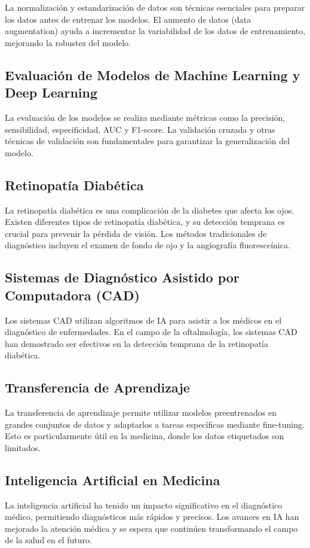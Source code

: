 La normalización y estandarización de datos son técnicas esenciales para preparar los datos antes de entrenar los modelos. El aumento de datos (data augmentation) ayuda a incrementar la variabilidad de los datos de entrenamiento, mejorando la robustez del modelo.

\subsection{Evaluación de Modelos de Machine Learning y Deep Learning}

La evaluación de los modelos se realiza mediante métricas como la precisión, sensibilidad, especificidad, AUC y F1-score. La validación cruzada y otras técnicas de validación son fundamentales para garantizar la generalización del modelo.

\subsection{Retinopatía Diabética}

La retinopatía diabética es una complicación de la diabetes que afecta los ojos. Existen diferentes tipos de retinopatía diabética, y su detección temprana es crucial para prevenir la pérdida de visión. Los métodos tradicionales de diagnóstico incluyen el examen de fondo de ojo y la angiografía fluoresceínica.

\subsection{Sistemas de Diagnóstico Asistido por Computadora (CAD)}

Los sistemas CAD utilizan algoritmos de IA para asistir a los médicos en el diagnóstico de enfermedades. En el campo de la oftalmología, los sistemas CAD han demostrado ser efectivos en la detección temprana de la retinopatía diabética.

\subsection{Transferencia de Aprendizaje}

La transferencia de aprendizaje permite utilizar modelos preentrenados en grandes conjuntos de datos y adaptarlos a tareas específicas mediante fine-tuning. Esto es particularmente útil en la medicina, donde los datos etiquetados son limitados.

\subsection{Inteligencia Artificial en Medicina}

La inteligencia artificial ha tenido un impacto significativo en el diagnóstico médico, permitiendo diagnósticos más rápidos y precisos. Los avances en IA han mejorado la atención médica y se espera que continúen transformando el campo de la salud en el futuro.